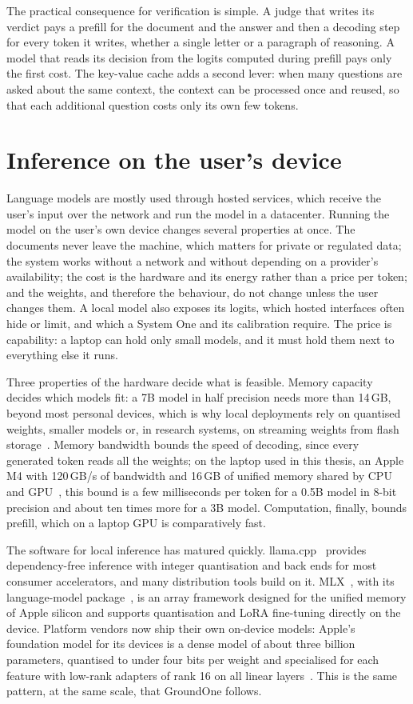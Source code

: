 The practical consequence for verification is simple. A judge that writes its verdict pays a prefill for the document
and the answer and then a decoding step for every token it writes, whether a single letter or a paragraph of reasoning.
A model that reads its decision from the logits computed during prefill pays only the first cost. The key-value cache
adds a second lever: when many questions are asked about the same context, the context can be processed once and reused,
so that each additional question costs only its own few tokens.

\section{Inference on the user's device}
\label{sec:bg-local}

Language models are mostly used through hosted services, which receive the user's input over the network and run the
model in a datacenter. Running the model on the user's own device changes several properties at once. The documents
never leave the machine, which matters for private or regulated data; the system works without a network and without
depending on a provider's availability; the cost is the hardware and its energy rather than a price per token; and the
weights, and therefore the behaviour, do not change unless the user changes them. A local model also exposes its
logits, which hosted interfaces often hide or limit, and which a System One and its calibration require. The price is
capability: a laptop can hold only small models, and it must hold them next to everything else it runs.

Three properties of the hardware decide what is feasible. Memory capacity decides which models fit: a 7B model in half
precision needs more than 14\,GB, beyond most personal devices, which is why local deployments rely on quantised
weights, smaller models or, in research systems, on streaming weights from flash storage~\cite{alizadeh2024flash}.
Memory bandwidth bounds the speed of decoding, since every generated token reads all the weights; on the laptop used in
this thesis, an Apple M4 with 120\,GB/s of bandwidth and 16\,GB of unified memory shared by CPU and
GPU~\cite{apple2024m4specs}, this bound is a few milliseconds per token for a 0.5B model in 8-bit precision and about ten
times more for a 3B model. Computation, finally, bounds prefill, which on a laptop GPU is comparatively fast.

The software for local inference has matured quickly. llama.cpp~\cite{llamacpp} provides dependency-free inference with
integer quantisation and back ends for most consumer accelerators, and many distribution tools build on it. MLX~\cite{mlx2023},
with its language-model package~\cite{mlxlm}, is an array framework designed for the unified memory of Apple silicon and
supports quantisation and LoRA fine-tuning directly on the device. Platform vendors now ship their own on-device models:
Apple's foundation model for its devices is a dense model of about three billion parameters, quantised to under four
bits per weight and specialised for each feature with low-rank adapters of rank 16 on all linear
layers~\cite{gunter2024apple}. This is the same pattern, at the same scale, that GroundOne follows.

